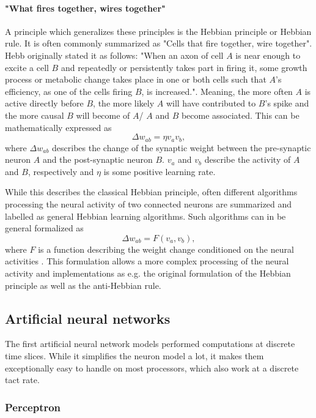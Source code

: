 \paragraph{"What fires together, wires together"} \label{c:hebb}
A principle which generalizes these principles is the Hebbian principle or Hebbian rule.
It is often commonly summarized as "Cells that fire together, wire together".
Hebb originally stated it as follows: "When an axon of cell $A$ is near enough to excite a cell $B$ and repeatedly or persistently takes part in firing it, some growth process or metabolic change takes place in one or both cells such that $A$'s efficiency, as one of the cells firing $B$, is increased."\cite{hebb19680}.
Meaning, the more often $A$ is active directly before $B$, the more likely $A$ will have contributed to $B$'s spike and the more causal $B$ will become of $A$/ $A$ and $B$ become associated.
This can be mathematically expressed as
\[
\Delta w_{ab} = \eta v_a v_b ,
\]
where $\Delta w_{ab}$ describes the change of the synaptic weight between the pre-synaptic neuron $A$ and the post-synaptic neuron $B$. 
$v_a$ and $v_b$ describe the activity of $A$ and $B$, respectively and $\eta$ is some positive learning rate. 

While this describes the classical Hebbian principle, often different algorithms processing the neural activity of two connected neurons are summarized and labelled as general Hebbian learning algorithms.
Such algorithms can in be general formalized as
\[
\Delta w_{ab} = F( v_a, v_b) , 
\]
where $F$ is a function describing the weight change conditioned on the neural activities \cite{gerstner2014neuronal}.     
This formulation allows a more complex processing of the neural activity and implementations as e.g. the original formulation of the Hebbian principle as well as the anti-Hebbian rule. 

\subsection{Artificial neural networks} \label{c:ann}

The first artificial neural network models performed computations at discrete time slices.
While it simplifies the neuron model a lot, it makes them exceptionally easy to handle on most processors, which also work at a discrete tact rate.

\subsubsection{Perceptron} \label{c:perceptron}

